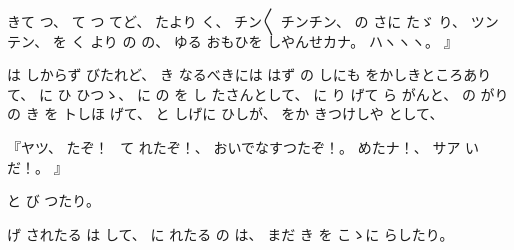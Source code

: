 %
きて
つ、
%
て
つ
てど、
%
たより
く、
%
チン〳〵
チンチン、
%
の
さに
たゞ
り、
%
ツンテン、
%
を
く
より
の
の、
%
ゆる
おもひを
しやんせカナ。
%
ハヽヽヽ。
』

%
は
しからず
びたれど、
%
き
なるべきには%
はず
の
しにも
をかしきところありて、
%
に
ひ
ひつゝ、
%
%
に
の
を
し
たさんとして、
%
に
り
げて
ら
がんと、
%
の
がりの
き
を
トしほ
げて、
%
と
しげに
ひしが、
%
をか
きつけしや
として、

%
『ヤツ、
%
たぞ！%
\,%
て
れたぞ！、
%
おいでなすつたぞ！。
%
めたナ！、
%
サア
いだ！。
』

%
と
び
つたり。

%
げ
されたる
は
して、
%
に
れたる
の
は、
%
%
まだ
き
を
こゝに
らしたり。
